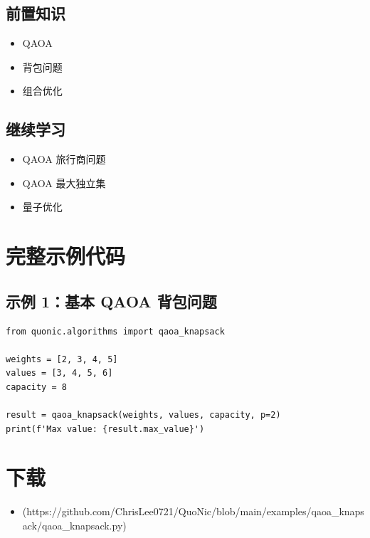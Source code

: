 \documentclass[12pt,a4paper]{article}
\begin{document}
\subsection{前置知识}
\begin{itemize}
  \item QAOA
  \item 背包问题
  \item 组合优化
\end{itemize}

\subsection{继续学习}
\begin{itemize}
  \item QAOA 旅行商问题
  \item QAOA 最大独立集
  \item 量子优化
\end{itemize}

\section{完整示例代码}

\subsection{示例 1：基本 QAOA 背包问题}

\begin{verbatim}
from quonic.algorithms import qaoa_knapsack

weights = [2, 3, 4, 5]
values = [3, 4, 5, 6]
capacity = 8

result = qaoa_knapsack(weights, values, capacity, p=2)
print(f'Max value: {result.max_value}')
\end{verbatim}

\section{下载}

\begin{itemize}
  \item [qaoa\_knapsack.py](https://github.com/ChrisLee0721/QuoNic/blob/main/examples/qaoa_knapsack/qaoa_knapsack.py)
\end{itemize}
\end{document}
